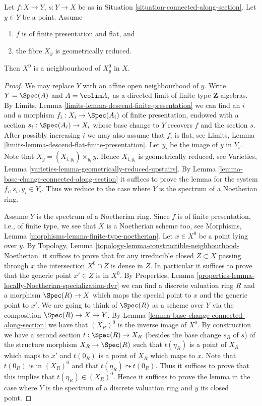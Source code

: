\begin{lemma}
\label{lemma-connected-along-section-open-neighbourhood}
Let $f : X \to Y$, $s : Y \to X$ be as in
Situation \ref{situation-connected-along-section}.
Let $y \in Y$ be a point.
Assume
\begin{enumerate}
\item $f$ is of finite presentation and flat, and
\item the fibre $X_y$ is geometrically reduced.
\end{enumerate}
Then $X^0$ is a neighbourhood of $X^0_y$ in $X$.
\end{lemma}

\begin{proof}
We may replace $Y$ with an affine open neighbourhood of $y$.
Write $Y = \Spec(A)$ and $A = \colim A_i$ as a directed
limit of finite type $\mathbf{Z}$-algebras. By
Limits, Lemma \ref{limits-lemma-descend-finite-presentation}
we can find an $i$ and a morphism $f_i : X_i \to \Spec(A_i)$ of
finite presentation, endowed with a section $s_i : \Spec(A_i) \to X_i$
whose base change to $Y$ recovers $f$ and the section $s$.
After possibly increasing $i$ we may also assume that $f_i$ is flat, see
Limits, Lemma \ref{limits-lemma-descend-flat-finite-presentation}.
Let $y_i$ be the image of $y$ in $Y_i$. Note that
$X_y = (X_{i, y_i}) \times_{y_i} y$. Hence $X_{i, y_i}$ is geometrically
reduced, see
Varieties, Lemma \ref{varieties-lemma-geometrically-reduced-upstairs}.
By
Lemma \ref{lemma-base-change-connected-along-section}
it suffices to prove the lemma for the system $f_i, s_i, y_i \in Y_i$.
Thus we reduce to the case where $Y$ is the spectrum of a Noetherian ring.

\medskip\noindent
Assume $Y$ is the spectrum of a Noetherian ring.
Since $f$ is of finite presentation,
i.e., of finite type, we see that $X$ is a Noetherian scheme too, see
Morphisms, Lemma \ref{morphisms-lemma-finite-type-noetherian}.
Let $x \in X^0$ be a point lying over $y$. By
Topology, Lemma \ref{topology-lemma-constructible-neighbourhood-Noetherian}
it suffices to prove that for any irreducible closed $Z \subset X$
passing through $x$ the intersection $X^0 \cap Z$ is dense in $Z$.
In particular it suffices to prove that the generic point $x' \in Z$
is in $X^0$. By
Properties, Lemma \ref{properties-lemma-locally-Noetherian-specialization-dvr}
we can find a discrete valuation ring $R$ and a morphism
$\Spec(R) \to X$ which maps the special point to $x$ and
the generic point to $x'$. We are going to think of $\Spec(R)$
as a scheme over $Y$ via the composition $\Spec(R) \to X \to Y$. By
Lemma \ref{lemma-base-change-connected-along-section}
we have that $(X_R)^0$ is the inverse image of $X^0$.
By construction we have a second section $t : \Spec(R) \to X_R$
(besides the base change $s_R$ of $s$)
of the structure morphism $X_R \to \Spec(R)$ such that
$t(\eta_R)$ is a point of $X_R$ which maps to $x'$ and
$t(0_R)$ is a point of $X_R$ which maps to $x$. Note that
$t(0_R)$ is in $(X_R)^0$ and that $t(\eta_R) \leadsto t(0_R)$.
Thus it suffices to prove that this implies that $t(\eta_R) \in (X_R)^0$.
Hence it suffices to prove the lemma in the case where $Y$
is the spectrum of a discrete valuation ring and $y$ its closed point.


\end{proof}
